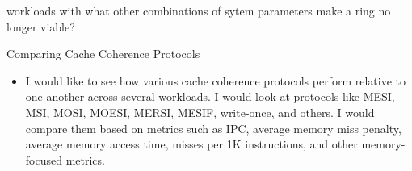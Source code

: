 \documentclass{article}
\begin{document}
\begin{enumerate}
\begin{minipage}{\textwidth}
\begin{itemize}
                 workloads with what other combinations of sytem parameters make a ring no longer viable?\\
         \end{itemize}
     \end{minipage}
     \begin{minipage}{\textwidth}
     \item Comparing Cache Coherence Protocols
         \begin{itemize}
             \item I would like to see how various cache coherence protocols perform relative to one another across several workloads. I would look at protocols like MESI, MSI, MOSI, MOESI, MERSI, MESIF, write-once, and others. I would compare them based on metrics such as IPC, average memory miss penalty, average memory access time, misses per 1K instructions, and other memory-focused metrics.\\
         \end{itemize}
     \end{minipage}
\end{enumerate}

\end{document}
